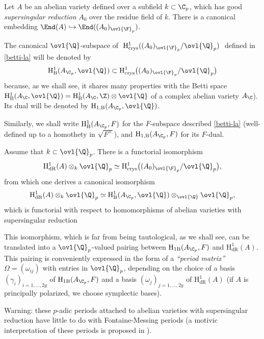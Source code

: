 \begin{para}
 Let $A$ be an abelian variety defined over a 
 subfield $k\subset \C_p$, which has good
 {\it supersingular reduction} $A_0$ over the residue field of $k$. 
 There is a canonical embedding
 $\End(A)\hookrightarrow  \End((A_0)_{\ovl{\F}_p})$. 

The canonical $\ovl{\Q}$-subspace of $\; \mathrm{H}^1_{\mathrm{crys}}((A_0)_{\ovl{\F}_p}/\ovl{\Q}_p)\;$ defined in
\ref{betti-la} will be denoted by 
\begin{equation*}
  \mathrm{H}^1_{\mathrm{B}}(A_{\C_p}, \ovl{\Q}) \subset 
  \mathrm{H}^1_{\mathrm{crys}}\bigl((A_0)_{\ovl{\F}_p}/\ovl{\Q}_p\bigr) 
 \end{equation*}
because, as we shall see, it shares many properties with the Betti space
 $\mathrm{H}^1_{\mathrm{B}}(A_\C, \ovl{\Q})= \mathrm{H}^1_{\mathrm{B}}(A_\C,\Z)\otimes \ovl{\Q}$ of a
complex
 abelian variety $A_\C$). Its dual will be denoted by $ \mathrm{H}_{1,\mathrm{B}}(A_{\C_p}, \ovl{\Q}) $.

Similarly, we shall write $\mathrm{H}^1_{\mathrm{B}}(A_{\C_p}, F)$ for the $F$-subspace described \ref{betti-la}
(well-defined up to a homothety in $\sqrt{F^\times}$), and $ \mathrm{H}_{1,\mathrm{B}}(A_{\C_p},F) $ for its $F$-dual.
 
\medskip  Assume that $k\subset \ovl{\Q}_p$.  There is a functorial 
 isomorphism \cite{fadrc1}
 \begin{equation*}
  \mathrm{H}^1_{\mathrm{dR}}(A)\otimes_k\ovl{\Q}_p \simeq
 \mathrm{H}^1_{\mathrm{crys}}\bigl((A_0)_{\ovl{\F}_p}/\ovl{\Q}_p\bigr),
 \end{equation*} 
 from which one derives a canonical isomorphism
 \begin{equation*}
  \mathrm{H}^1_{\mathrm{dR}}(A)\otimes_k\ovl{\Q}_p \simeq 
  \mathrm{H}^1_{\mathrm{B}}(A_{\C_p},\ovl{\Q})\otimes_{\ovl{\Q}}\ovl{\Q}_p,
 \end{equation*} 
 which is functorial with respect to homomorphisms 
 of abelian varieties with supersingular reduction

 \noindent This isomorphism, which is far from being tautological, as we shall see, 
 can be translated into a $\ovl{\Q}_p$-valued pairing between 
 $\mathrm{H}_{1\mathrm{B}}(A_{\C_p}, F)$ and $\mathrm{H}^1_{\mathrm{dR}}(A)$. 
This pairing is conveniently expressed in the form of a {\it ``period 
 matrix''} $\Omega=(\omega_{ij})$ with
 entries in $\ovl{\Q}_p$, depending on the choice of a basis 
 $(\gamma_i)_{i=1,\ldots ,2g}$ of $\mathrm{H}_{1\mathrm{B}}(A_{\C_p}, F)$
 and a basis $(\omega_j)_{j=1,\ldots ,2g}$ of 
 $\mathrm{H}^1_{\mathrm{dR}}(A)$ (if $A$ is principally polarized, we
 choose symplectic bases). 

\noindent Warning: these $p$-adic periods attached to abelian varieties with supersingular reduction have little to
do with Fontaine-Messing periods  (a motivic interpretation of these periods is proposed in
\cite{tdmeigdvpdg}). 

\end{para}

